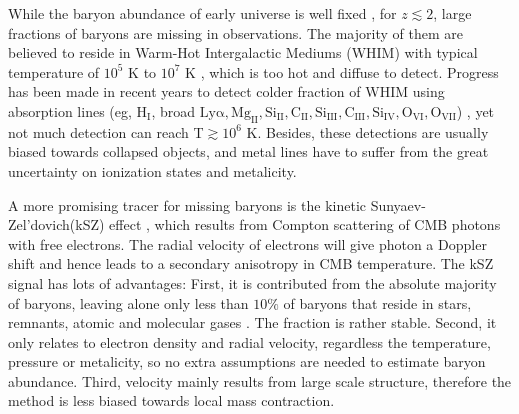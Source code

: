While the baryon abundance of early universe is well fixed 
\cite{Cooke14,Fukugita98,Komatsu11,Hinshaw13}, 
for $z\lesssim 2$, large fractions of baryons are missing in observations.  
The majority of them are believed to reside in Warm-Hot Intergalactic Mediums (WHIM) with typical temperature of $10^5$ K to $10^7$ K \cite{Pen1999,Soltan06}, which is too hot and diffuse to detect.
Progress has been made in recent years to detect colder fraction of WHIM using absorption lines 
(eg, $\mathrm{H_I}$, broad $\mathrm{Ly\alpha, Mg_{II},Si_{II}, C_{II}, Si_{III}, C_{III}, Si_{IV}, O_{VI}, O_{VII}}$) \cite{Bregman07,Werk14}, 
yet not much detection can reach T$\gtrsim 10^6$ K. 
Besides, these detections are usually biased towards collapsed objects, 
 and metal lines have to suffer from the great uncertainty on ionization states 
and metalicity.

A more promising tracer for missing baryons is the kinetic Sunyaev-Zel'dovich(kSZ) effect \cite{Sunyaev72,Sunyaev80,Vishniac87}, 
which results from Compton scattering of CMB photons with free electrons. 
The radial velocity of electrons will give photon a Doppler shift 
and hence leads to a 
secondary anisotropy in CMB temperature.
The kSZ signal has lots of advantages: 
First, it is contributed from the absolute majority of baryons, 
leaving alone only less than $10\%$ of baryons that 
reside in stars, remnants, atomic and molecular gases \cite{Fukugita04}. 
The fraction is rather stable.  
Second, it only relates to electron density and radial velocity, 
regardless the temperature, pressure or metalicity,  
so no extra assumptions are needed to estimate baryon abundance.  
Third, velocity mainly results from large scale structure, 
therefore the method is less biased towards local mass contraction.  

